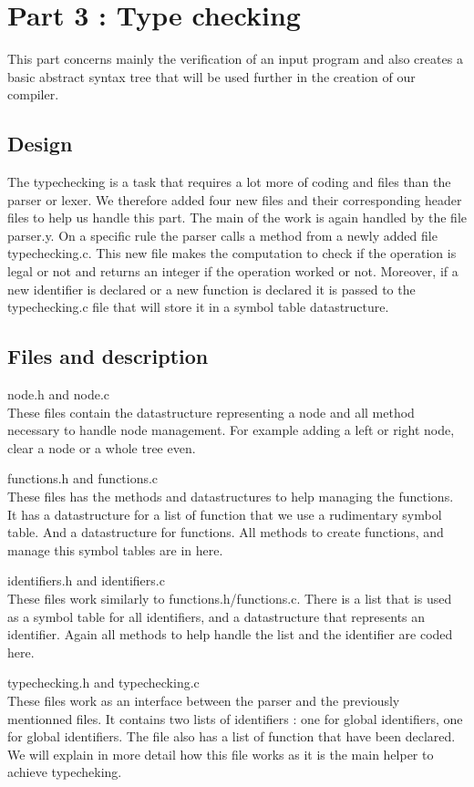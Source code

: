 \documentclass{article}
\begin{document}
\section{Part 3 : Type checking}
This part concerns mainly the verification of an input program and also creates a basic abstract syntax tree that will be used further in the creation of our compiler. 
\subsection{Design}
The typechecking is a task that requires a lot more of coding and files than the parser or lexer. We therefore added four new files and their corresponding header files to help us handle this part. 
The main of the work is again handled by the file parser.y. On a specific rule the parser calls a method from a newly added file typechecking.c. This new file makes the computation to check if the operation is legal or not and returns an integer if the operation worked or not. Moreover, if a new identifier is declared or a new function is declared it is passed to the typechecking.c file that will store it in a symbol table datastructure. 
\subsection{Files and description}
\label{definition}
\begin{description}
\item{node.h and node.c}\\ These files contain the datastructure representing a node and all method necessary to handle node management. For example adding a left or right node, clear a node or a whole tree even. 
\item{functions.h and functions.c} \\ These files has the methods and datastructures to help managing the functions. It has a datastructure for a list of function that we use a rudimentary symbol table. And a datastructure for functions. All methods to create functions, and manage this symbol tables are in here. 
\item{identifiers.h and identifiers.c} \\These files work similarly to functions.h/functions.c. There is a list that is used as a symbol table for all identifiers, and a datastructure that represents an identifier. Again all methods to help handle the list and the identifier are coded here. 
\item{typechecking.h and typechecking.c} \\ These files work as an interface between the parser and the previously mentionned files. It contains two lists of identifiers : one for global identifiers, one for global identifiers. The file also has a list of function that have been declared. We will explain in more detail how this file works as it is the main helper to achieve typecheking. 
\end{description}
\end{document}
